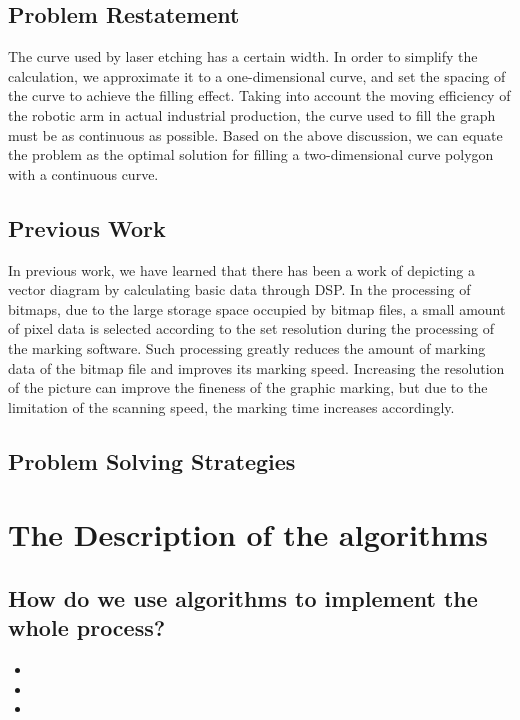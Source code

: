\documentclass{apmcmthesis}
\begin{document}
\subsection{Problem Restatement}
  The curve used by laser etching has a certain width. In order to simplify the calculation, we approximate it to a one-dimensional curve, and set the spacing of the curve to achieve the filling effect. Taking into account the moving efficiency of the robotic arm in actual industrial production, the curve used to fill the graph must be as continuous as possible. Based on the above discussion, we can equate the problem as the optimal solution for filling a two-dimensional curve polygon with a continuous curve.


\subsection{Previous Work}
  In previous work, we have learned that there has been a work of depicting a vector diagram by calculating basic data through DSP. In the processing of bitmaps, due to the large storage space occupied by bitmap files, a small amount of pixel data is selected according to the set resolution during the processing of the marking software. Such processing greatly reduces the amount of marking data of the bitmap file and improves its marking speed. Increasing the resolution of the picture can improve the fineness of the graphic marking, but due to the limitation of the scanning speed, the marking time increases accordingly.


\subsection{Problem Solving Strategies}


\section{The Description of the algorithms}
\subsection{How do we use algorithms to implement the whole process?}

\begin{itemize}
  \item
  \item
  \item
\end{itemize}
\end{document}
